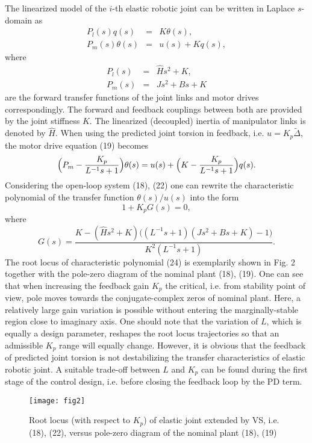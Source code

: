 \documentclass[a4paper, 10pt, conference]{ieeeconf}
\begin{document}
The linearized model of the $i$-th elastic robotic
joint can be written in
Laplace $s$-domain as
\begin{eqnarray} \label{eq:19a}
P_{l} (s) q(s)       &=& K \theta(s),\\
  P_{m} (s) \theta(s)  &=& u(s) + K q(s),
  \label{eq:19b}
\end{eqnarray}
where
\begin{eqnarray}
\label{eq:19c}
P_{l} (s) &=& \hat{H} s^{2} + K,\\
  P_{m} (s) &=& Js^{2} + B s + K
  \label{eq:19d}
\end{eqnarray}
are the forward transfer functions of the joint links and motor
drives correspondingly. The forward and feedback couplings between
both are provided by the joint stiffness $K$. The linearized
(decoupled) inertia of manipulator links is denoted by $\hat{H}$.
When using the predicted joint torsion in feedback, i.e. $u =
K_{p} \tilde{\Delta}$, the motor drive equation (19) becomes
\begin{equation}\label{19d}
\Bigl(P_{m} - \frac{K_{p}}{L^{-1}s + 1}\Bigr) \theta(s) = u(s) +
\Bigl(K - \frac{K_{p}}{L^{-1}s + 1}\Bigr)q(s).
\end{equation}
Considering the open-loop system (18), (22) one can rewrite the
characteristic polynomial of the transfer function $ \theta(s)/
u(s)$ into the form
\begin{equation}\label{19e}
1 + K_{p} G(s) = 0,
\end{equation}
where
\begin{equation}\label{19f}
G(s) = \frac{K - (\hat{H}s^{2} + K)\bigl((L^{-1}s + 1)(Js^{2} + Bs
+K)-1\bigr)}{K^{2}(L^{-1}s +1)}.
\end{equation}
The root locus of characteristic polynomial (24) is exemplarily
shown in Fig. 2 together with the pole-zero diagram of the nominal
plant (18), (19). One can see that when increasing the feedback
gain $K_{p}$ the critical, i.e. from stability point of view, pole
moves towards the conjugate-complex zeros of nominal plant. Here,
a relatively large gain variation is possible without entering the
marginally-stable region close to imaginary axis. One should note
that the variation of $L$, which is equally a design parameter,
reshapes the root locus trajectories so that an admissible $K_{p}$
range will equally change. However, it is obvious that the
feedback of predicted joint torsion is not destabilizing the
transfer characteristics of elastic robotic joint. A suitable
trade-off between $L$ and $K_{p}$ can be found during the first
stage of the control design, i.e. before closing the feedback loop
by the PD term.
\begin{figure}[!h]
\centering
\texttt{[image: fig2]}
\caption{Root locus (with respect to $K_p$) of elastic joint
extended by VS, i.e. (18), (22), versus pole-zero diagram of the
nominal plant (18), (19)} \label{fig:pzmap}
\end{figure}
\end{document}
